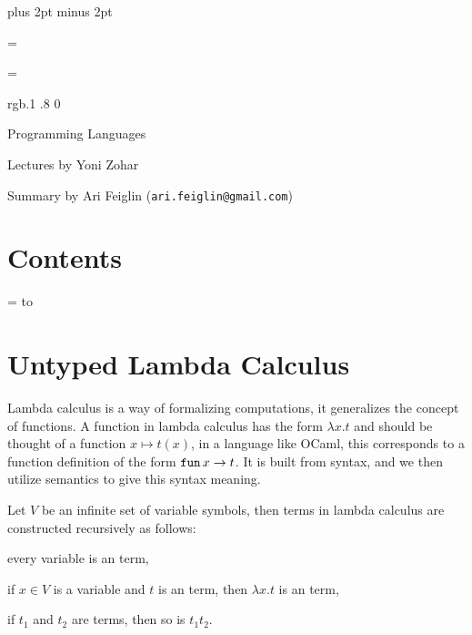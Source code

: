 


\parindent=0pt
\parskip=3pt plus 2pt minus 2pt



\footline={}


\headline={}

\color rgb{.1 .8 0}

{\def\boxshadowcolor{rgb{.2 .9 .2}}

    \centerline{Programming Languages}
    \smallskip
    \centerline{Lectures by Yoni Zohar}
    \centerline{Summary by Ari Feiglin ({\tt ari.feiglin@gmail.com})}

\eppbox

\bigskip

\section*{Contents}

\tableofcontents
\eppbox

}

\vfill\break

\color{black}

\newif\ifpageodd
\pageoddtrue
\headline={%
    \hbox to \hsize{\color{black}%
        \ifpageodd\hfil{\it\currsubsection\quad\bf\folio}\global\pageoddfalse%
        \else{\bf\folio\quad\it\currsubsection}\hfil\global\pageoddtrue\fi%
    }%
}

\section{Untyped Lambda Calculus}

Lambda calculus is a way of formalizing computations, it generalizes the concept of functions.
A function in lambda calculus has the form $\lambda x.t$ and should be thought of a function $x\mapsto t(x)$, in a language like OCaml, this corresponds to a function definition of the form
${\tt fun}\,x\to t$.
It is built from syntax, and we then utilize semantics to give this syntax meaning.

\bdefn

    Let $V$ be an infinite set of variable symbols, then terms in lambda calculus are constructed recursively as follows:
    \benum
        \item every variable is an term,
        \item if $x\in V$ is a variable and $t$ is an term, then $\lambda x.t$ is an term,
        \item if $t_1$ and $t_2$ are terms, then so is $t_1t_2$.
    \eenum

